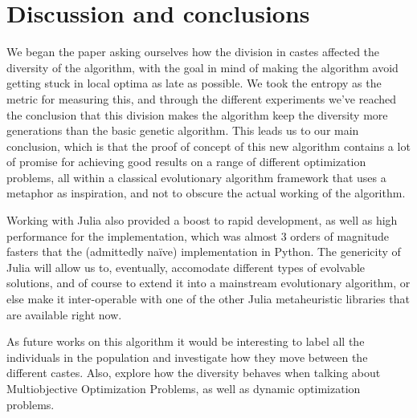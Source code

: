 \section{Discussion and conclusions}
\label{sec:conc}

We began the paper asking ourselves how the division in castes affected
the diversity of the algorithm, with the goal in mind of making the algorithm avoid getting stuck
in local optima as late as possible. We took the entropy as the metric for measuring this, and
through the different experiments we've reached the conclusion that this division makes
the algorithm keep the diversity more generations than the basic genetic
algorithm. This leads us to our main conclusion, which is that the proof of
concept of this new algorithm contains a lot of promise for achieving good
results on a range of different optimization problems, all within a classical
evolutionary algorithm framework that uses a metaphor as inspiration, and not to
obscure the actual working of the algorithm.

Working with Julia also provided a boost to rapid development, as well as high
performance for the implementation, which was almost 3 orders of magnitude
fasters that the (admittedly naïve) implementation in Python. The genericity of
Julia will allow us to, eventually, accomodate different types of evolvable
solutions, and of course to extend it into a mainstream evolutionary algorithm,
or else make it inter-operable with one of the other Julia metaheuristic
libraries that are available right now.

As future works on this algorithm it would be interesting to label all the individuals in
the population and investigate how they move between the different castes. Also, explore
how the diversity behaves when talking about Multiobjective Optimization
Problems, as well as dynamic optimization problems.
